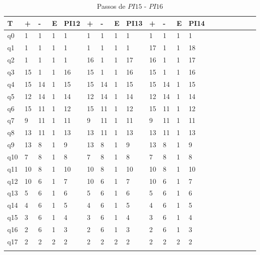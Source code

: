 \documentclass[12pt,a4paper]{report}
\begin{document}
\begin{table}[ht]
\caption{\label{tab:table-name} Passos de $PI15$ - $PI16$}
\centering
\begin{tabular}{ l l l l l l l l l l l l l l l l l l l l }
\hline
\hline
T      & +  & -  & E & PI12 & +  & -  & E & PI13 & +  & -  & E & PI14 &  &  &  &  &  &  &  \\ \hline
q0  & 1  & 1  & 1 & 1    & 1  & 1  & 1 & 1    & 1  & 1  & 1 & 1    &  &  &  &  &  &  &  \\
q1  & 1  & 1  & 1 & 1    & 1  & 1  & 1 & 1    & 17 & 1  & 1 & 18   &  &  &  &  &  &  &  \\
q2  & 1  & 1  & 1 & 1    & 16 & 1  & 1 & 17   & 16 & 1  & 1 & 17   &  &  &  &  &  &  &  \\
q3  & 15 & 1  & 1 & 16   & 15 & 1  & 1 & 16   & 15 & 1  & 1 & 16   &  &  &  &  &  &  &  \\
q4  & 15 & 14 & 1 & 15   & 15 & 14 & 1 & 15   & 15 & 14 & 1 & 15   &  &  &  &  &  &  &  \\
q5  & 12 & 14 & 1 & 14   & 12 & 14 & 1 & 14   & 12 & 14 & 1 & 14   &  &  &  &  &  &  &  \\
q6  & 15 & 11 & 1 & 12   & 15 & 11 & 1 & 12   & 15 & 11 & 1 & 12   &  &  &  &  &  &  &  \\
q7  & 9  & 11 & 1 & 11   & 9  & 11 & 1 & 11   & 9  & 11 & 1 & 11   &  &  &  &  &  &  &  \\
q8  & 13 & 11 & 1 & 13   & 13 & 11 & 1 & 13   & 13 & 11 & 1 & 13   &  &  &  &  &  &  &  \\
q9  & 13 & 8  & 1 & 9    & 13 & 8  & 1 & 9    & 13 & 8  & 1 & 9    &  &  &  &  &  &  &  \\
q10 & 7  & 8  & 1 & 8    & 7  & 8  & 1 & 8    & 7  & 8  & 1 & 8    &  &  &  &  &  &  &  \\
q11 & 10 & 8  & 1 & 10   & 10 & 8  & 1 & 10   & 10 & 8  & 1 & 10   &  &  &  &  &  &  &  \\
q12 & 10 & 6  & 1 & 7    & 10 & 6  & 1 & 7    & 10 & 6  & 1 & 7    &  &  &  &  &  &  &  \\
q13 & 5  & 6  & 1 & 6    & 5  & 6  & 1 & 6    & 5  & 6  & 1 & 6    &  &  &  &  &  &  &  \\
q14 & 4  & 6  & 1 & 5    & 4  & 6  & 1 & 5    & 4  & 6  & 1 & 5    &  &  &  &  &  &  &  \\
q15 & 3  & 6  & 1 & 4    & 3  & 6  & 1 & 4    & 3  & 6  & 1 & 4    &  &  &  &  &  &  &  \\
q16 & 2  & 6  & 1 & 3    & 2  & 6  & 1 & 3    & 2  & 6  & 1 & 3    &  &  &  &  &  &  &  \\
q17 & 2  & 2  & 2 & 2    & 2  & 2  & 2 & 2    & 2  & 2  & 2 & 2    &  &  &  &  &  &  &  \\
       &    &    &   &      &    &    &   &      &    &    &   &      &  &  &  &  &  &  & \\
       \hline
\end{tabular}
\end{table}
\end{document}
